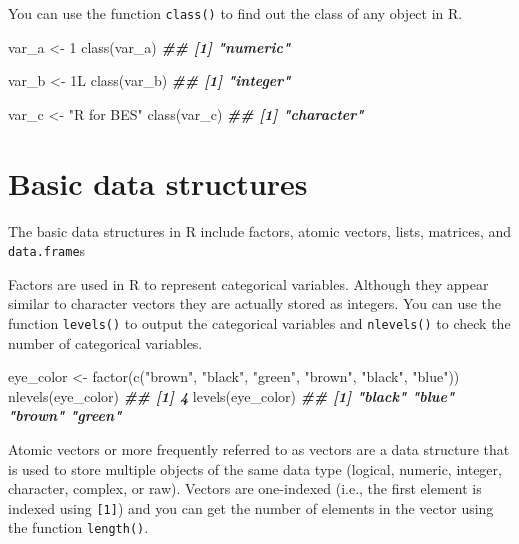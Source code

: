 \documentclass[
]{book}
\newenvironment{Shaded}{\begin{snugshade}}{\end{snugshade}}
\newcommand{\DecValTok}[1]{\textcolor[rgb]{0.00,0.00,0.81}{#1}}
\newcommand{\DocumentationTok}[1]{\textcolor[rgb]{0.56,0.35,0.01}{\textbf{\textit{#1}}}}
\newcommand{\FunctionTok}[1]{\textcolor[rgb]{0.00,0.00,0.00}{#1}}
\newcommand{\NormalTok}[1]{#1}
\newcommand{\OtherTok}[1]{\textcolor[rgb]{0.56,0.35,0.01}{#1}}
\newcommand{\StringTok}[1]{\textcolor[rgb]{0.31,0.60,0.02}{#1}}
\begin{document}
You can use the function \texttt{class()} to find out the class of any object in R.

\begin{Shaded}
\begin{Highlighting}[]
\NormalTok{var\_a }\OtherTok{\textless{}{-}} \DecValTok{1}
\FunctionTok{class}\NormalTok{(var\_a)}
\DocumentationTok{\#\# [1] "numeric"}

\NormalTok{var\_b }\OtherTok{\textless{}{-}}\NormalTok{ 1L}
\FunctionTok{class}\NormalTok{(var\_b)}
\DocumentationTok{\#\# [1] "integer"}

\NormalTok{var\_c }\OtherTok{\textless{}{-}} \StringTok{"R for BES"}
\FunctionTok{class}\NormalTok{(var\_c)}
\DocumentationTok{\#\# [1] "character"}
\end{Highlighting}
\end{Shaded}

\hypertarget{basic-data-structures}{%
\section{Basic data structures}\label{basic-data-structures}}

The basic data structures in R include factors, atomic vectors, lists, matrices, and \texttt{data.frame}s

Factors are used in R to represent categorical variables. Although they appear similar to character vectors they are actually stored as integers. You can use the function \texttt{levels()} to output the categorical variables and \texttt{nlevels()} to check the number of categorical variables.

\begin{Shaded}
\begin{Highlighting}[]
\NormalTok{eye\_color }\OtherTok{\textless{}{-}} \FunctionTok{factor}\NormalTok{(}\FunctionTok{c}\NormalTok{(}\StringTok{"brown"}\NormalTok{, }\StringTok{"black"}\NormalTok{, }\StringTok{"green"}\NormalTok{, }\StringTok{"brown"}\NormalTok{, }\StringTok{"black"}\NormalTok{, }\StringTok{"blue"}\NormalTok{))}
\FunctionTok{nlevels}\NormalTok{(eye\_color)}
\DocumentationTok{\#\# [1] 4}
\FunctionTok{levels}\NormalTok{(eye\_color)}
\DocumentationTok{\#\# [1] "black" "blue"  "brown" "green"}
\end{Highlighting}
\end{Shaded}

Atomic vectors or more frequently referred to as vectors are a data structure that is used to store multiple objects of the same data type (logical, numeric, integer, character, complex, or raw). Vectors are one-indexed (i.e., the first element is indexed using \texttt{{[}1{]}}) and you can get the number of elements in the vector using the function \texttt{length()}.
\end{document}
